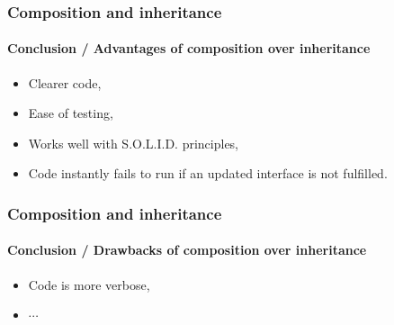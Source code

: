 
\begin{frame}
    \frametitle{Composition and inheritance}
    \framesubtitle{Conclusion / Advantages of composition over inheritance}

    \begin{itemize}[<+->]
        \item Clearer code,
        \item Ease of testing,
        \item Works well with S.O.L.I.D. principles,
        \item Code instantly fails to run if an updated interface is not fulfilled.
    \end{itemize}
\end{frame}

\begin{frame}
    \frametitle{Composition and inheritance}
    \framesubtitle{Conclusion / Drawbacks of composition over inheritance}

    \begin{itemize}[<+->]
        \item Code is more verbose,
        \item $\cdots$
    \end{itemize}
\end{frame}
